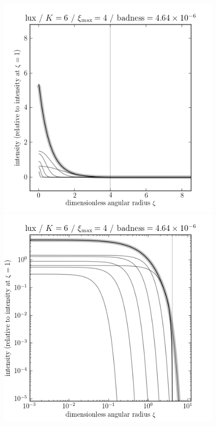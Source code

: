 \documentclass[12pt,pdftex,preprint]{aastex}
\newlength{\figurewidth}
\begin{document}
\clearpage
\begin{figure}
\includegraphics[width=\figurewidth]{lux_K06_MR04_profile.png}%
\includegraphics[width=\figurewidth]{lux_K06_MR04_profile_log.png}\\

\end{figure}
\end{document}
